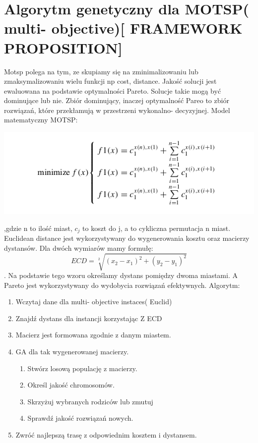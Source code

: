 \documentclass[11pt]{article}
\begin{document}
\section{Algorytm genetyczny dla MOTSP( multi- objective)[ FRAMEWORK PROPOSITION]}
Motsp polega na tym, ze skupiamy się na zminimalizowaniu lub zmaksymalizowaniu wielu funkcji np cost, distance. Jakość solucji jest ewaluowana na podstawie optymalności Pareto. Solucje takie mogą być dominujące lub nie. Zbiór dominujący, inaczej optymalność Pareo to zbiór rozwiązań, które przekłamują w przestrzeni wykonalno- decyzyjnej. Model matematyczny MOTSP:\\
\begin{center}
\includegraphics[scale=0.7]{mmotsp.png}
\end{center},gdzie n to ilość miast, $c_j$ to koszt do j, a  to cykliczna permutacja n miast. Euclidean distance jest wykorzystywany do wygenerowania kosztu oraz macierzy dystansów. Dla dwóch wymiarów mamy formułę:\\
$$ECD = \sqrt[2]{(x_2-x_1)^2 + (y_2-y_1)^2}$$.
Na podstawie tego wzoru określamy dystans pomiędzy dwoma miastami. A Pareto jest wykorzystywany do wydobycia rozwiązań efektywnych. Algorytm:
\begin{enumerate}
\item Wczytaj dane dla multi- objective instaces( Euclid)
\item Znajdź dystans dla instancji korzystając Z ECD
\item Macierz jest formowana zgodnie z danym miastem.
\item GA dla tak wygenerowanej macierzy.
	\begin{enumerate}
	\item Stwórz losową populację z macierzy.
	\item Określ jakość chromosomów.
	\item Skrzyżuj wybranych rodziców lub zmutuj
	\item Sprawdź jakość rozwiązań nowych. 
	\end{enumerate}
\item Zwróć najlepszą trasę z odpowiednim kosztem i dystansem.
\end{enumerate}
\end{document}
